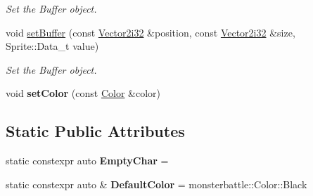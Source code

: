 \begin{DoxyCompactItemize}
\begin{DoxyCompactList}\small\item\em Set the Buffer object. \end{DoxyCompactList}\item 
void \hyperlink{classmonsterbattle_1_1Sprite_a3b90d6f5245584f44bdeb101ea579150}{set\+Buffer} (const \hyperlink{structmonsterbattle_1_1Vector}{Vector2i32} \&position, const \hyperlink{structmonsterbattle_1_1Vector}{Vector2i32} \&size, Sprite\+::\+Data\+\_\+t value)
\begin{DoxyCompactList}\small\item\em Set the Buffer object. \end{DoxyCompactList}\item 
\mbox{\label{classmonsterbattle_1_1Sprite_ae0b0b7ef698dae41d05940003a1d1f68}} 
void {\bfseries set\+Color} (const \hyperlink{structmonsterbattle_1_1Color}{Color} \&color)
\end{DoxyCompactItemize}
\subsection*{Static Public Attributes}
\begin{DoxyCompactItemize}
\item 
\mbox{\label{classmonsterbattle_1_1Sprite_a1ce672440f8f7c4225205f9341d3950b}} 
static constexpr auto {\bfseries Empty\+Char} = \textquotesingle{} \textquotesingle{}
\item 
\mbox{\label{classmonsterbattle_1_1Sprite_a672ac224c230cee1bf3e84e7a4f5f5c5}} 
static constexpr auto \& {\bfseries Default\+Color} = monsterbattle\+::\+Color\+::\+Black
\end{DoxyCompactItemize}
